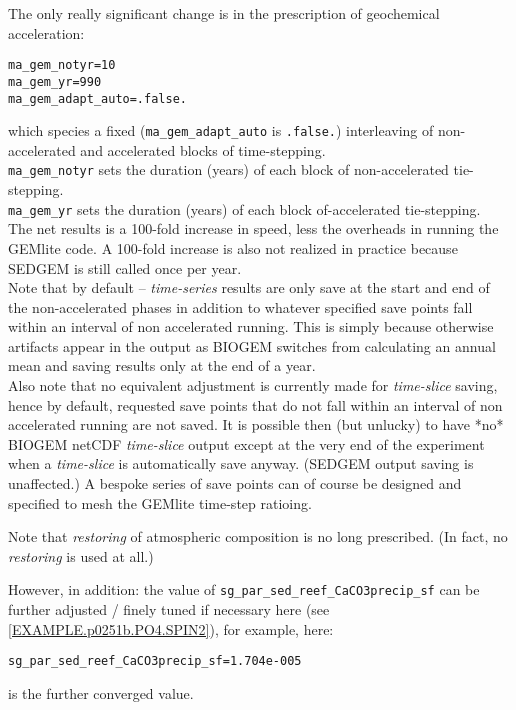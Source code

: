 \documentclass[10pt,twoside]{article}
\begin{document}
\begin{compactitem}

        \item The only really significant change is in the prescription of geochemical acceleration:
\vspace{-5pt}\begin{verbatim}
ma_gem_notyr=10
ma_gem_yr=990
ma_gem_adapt_auto=.false.
\end{verbatim}\vspace{-5pt}
which species a fixed (\texttt{ma\_gem\_adapt\_auto} is \texttt{.false.}) interleaving of non-accelerated and accelerated blocks of time-stepping.
\\ \texttt{ma\_gem\_notyr} sets the duration (years) of each block of non-accelerated tie-stepping.
\\ \texttt{ma\_gem\_yr} sets the duration (years) of each block of-accelerated tie-stepping.
\\ The net results is a 100-fold increase in speed, less the overheads in running the GEMlite code. A 100-fold increase is also not realized in practice because SEDGEM is still called once per year.
\\ Note that by default -- \textit{time-series} results are only save at the start and end of the non-accelerated phases in addition to whatever specified save points fall within an interval of non accelerated running. This is simply because otherwise artifacts appear in the output as BIOGEM switches from calculating an annual mean and saving results only at the end of a year.
\\ Also note that no equivalent adjustment is currently made for \textit{time-slice} saving, hence by default, requested save points that do not fall within an interval of non accelerated running are not saved. It is possible then (but unlucky) to have *no* BIOGEM netCDF \textit{time-slice} output except at the very end of the experiment when a \textit{time-slice} is automatically save anyway. (SEDGEM output saving is unaffected.) A bespoke series of save points can of course be designed and specified to mesh the GEMlite time-step ratioing.

        \item Note that \textit{restoring} of atmospheric composition is no long prescribed. (In fact, no \textit{restoring} is used at all.)
        
        \end{compactitem}
                
However, in addition: the value of \texttt{sg\_par\_sed\_reef\_CaCO3precip\_sf} can be further adjusted / finely tuned if necessary here (see \ref{EXAMPLE.p0251b.PO4.SPIN2}), for example, here:
\vspace{-5pt}\begin{verbatim}
sg_par_sed_reef_CaCO3precip_sf=1.704e-005
                \end{verbatim}\vspace{-5pt}
is the further converged value.
\end{document}
